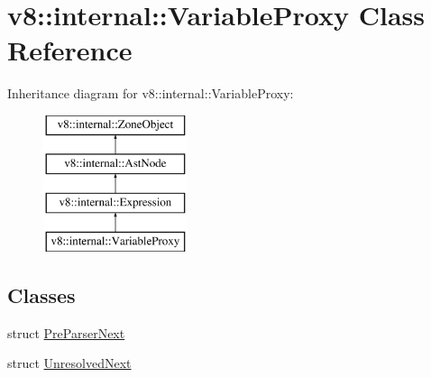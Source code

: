 \hypertarget{classv8_1_1internal_1_1VariableProxy}{}\section{v8\+:\+:internal\+:\+:Variable\+Proxy Class Reference}
\label{classv8_1_1internal_1_1VariableProxy}
Inheritance diagram for v8\+:\+:internal\+:\+:Variable\+Proxy\+:\begin{figure}[H]
\begin{center}
\leavevmode
\includegraphics[height=4.000000cm]{classv8_1_1internal_1_1VariableProxy}
\end{center}
\end{figure}
\subsection*{Classes}
\begin{DoxyCompactItemize}
\item 
struct \mbox{\hyperlink{structv8_1_1internal_1_1VariableProxy_1_1PreParserNext}{Pre\+Parser\+Next}}
\item 
struct \mbox{\hyperlink{structv8_1_1internal_1_1VariableProxy_1_1UnresolvedNext}{Unresolved\+Next}}
\end{DoxyCompactItemize}

